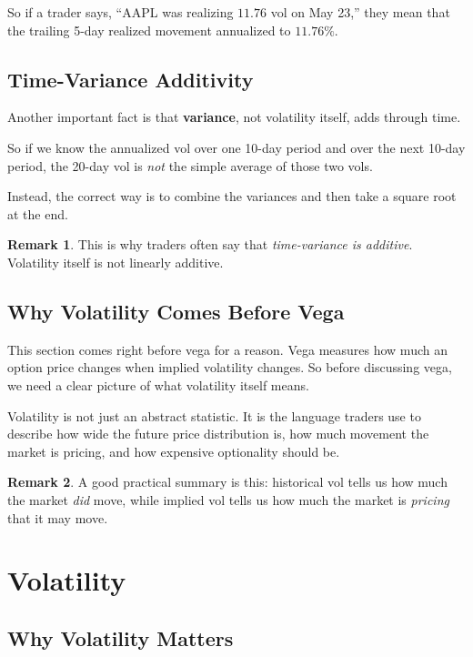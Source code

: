 \documentclass[11pt]{article}
\theoremstyle{definition}
\newtheorem{remark}{Remark}[section]
\begin{document}
So if a trader says, “AAPL was realizing \(11.76\) vol on May 23,” they mean that the trailing 5-day realized movement annualized to \(11.76\%\).

\subsection{Time-Variance Additivity}

Another important fact is that \textbf{variance}, not volatility itself, adds through time.

So if we know the annualized vol over one 10-day period and over the next 10-day period, the 20-day vol is \emph{not} the simple average of those two vols.

Instead, the correct way is to combine the variances and then take a square root at the end.

\begin{remark}
This is why traders often say that \emph{time-variance is additive}. Volatility itself is not linearly additive.
\end{remark}

\subsection{Why Volatility Comes Before Vega}

This section comes right before vega for a reason. Vega measures how much an option price changes when implied volatility changes. So before discussing vega, we need a clear picture of what volatility itself means.

Volatility is not just an abstract statistic. It is the language traders use to describe how wide the future price distribution is, how much movement the market is pricing, and how expensive optionality should be.

\begin{remark}
A good practical summary is this: historical vol tells us how much the market \emph{did} move, while implied vol tells us how much the market is \emph{pricing} that it may move.
\end{remark}

\section{Volatility}

\subsection{Why Volatility Matters}
\end{document}

